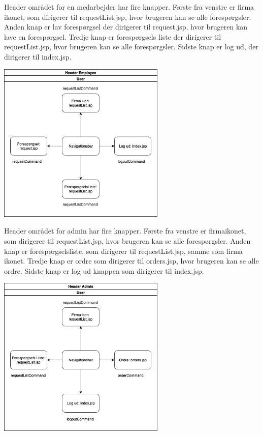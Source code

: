 \documentclass[11pt]{report}
\begin{document}
Header området for en medarbejder har fire knapper. Første fra venstre
er firma ikonet, som dirigerer til requestList.jsp, hvor brugeren kan
se alle forespørgsler. Anden knap er lav forespørgsel der dirigerer
til request.jsp, hvor brugeren kan lave en forespørgsel. Tredje knap
er forespørgsels liste der dirigerer til requestList.jsp, hvor
brugeren kan se alle forespørgsler. Sidste knap er log ud, der
dirigerer til index.jsp. \\
\begin{center}
\includegraphics[width=8cm]{HeaderEmployee.png}
\end{center}
\newpage
\noindent Header området for admin har fire knapper. Første fra venstre er
firmaikonet, som dirigerer til requestList.jsp, hvor brugeren kan se
alle forespørgsler. Anden knap er forespørgselsliste, som dirigerer
til requestList.jsp, samme som firma ikonet. Tredje knap er ordre som
dirigerer til orders.jsp, hvor brugeren kan se alle ordre. Sidste knap
er log ud knappen som dirigerer til index.jsp. \\
\begin{center}
\includegraphics[width=8cm]{HeaderAdmin.png}
\end{center}
\end{document}

